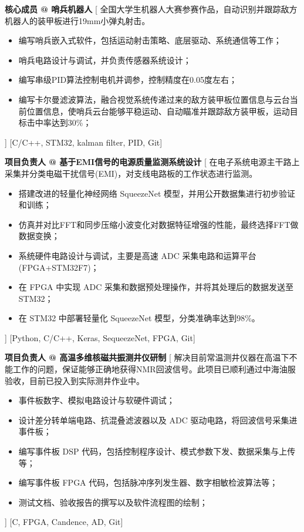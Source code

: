\begin{experiences}
    {\textbf{核心成员 @ 哨兵机器人}}%
    [
    全国大学生机器人大赛参赛作品，自动识别并跟踪敌方机器人的装甲板进行19mm小弹丸射击。
        \begin{itemize}
            \item {编写哨兵嵌入式软件，包括运动射击策略、底层驱动、系统通信等工作；}
            \item {哨兵电路设计与调试，并负责传感器系统设计；}
            \item {编写串级PID算法控制电机并调参，控制精度在0.05度左右；}
            \item {编写卡尔曼滤波算法，融合视觉系统传递过来的敌方装甲板位置信息与云台当前位置信息，使哨兵云台能够平稳运动、自动瞄准并跟踪敌方装甲板，运动目标击中率达到30\%；}
        \end{itemize}
    ]
    [C/C++, STM32, kalman filter, PID, Git]
    \separator{0.5ex}

    {\textbf{项目负责人 @ 基于EMI信号的电源质量监测系统设计 }}%
    [
    在电子系统电源主干路上采集并分类电磁干扰信号(EMI)，对支线电路板的工作状态进行监测。
        \begin{itemize}
            \item {搭建改进的轻量化神经网络 SqueezeNet 模型，并用公开数据集进行初步验证和训练；}
            \item {仿真并对比FFT和同步压缩小波变化对数据特征增强的性能，最终选择FFT做数据变换；}
            \item {系统硬件电路设计与调试，主要是高速 ADC 采集电路和运算平台(FPGA+STM32F7)；}
            \item {在 FPGA 中实现 ADC 采集和数据预处理操作，并将其处理后的数据发送至STM32；}
            \item {在 STM32 中部署轻量化 SqueezeNet 模型，分类准确率达到98\%。}
        \end{itemize}]
    [Python, C/C++, Keras, SequeezeNet, FPGA, Git]
    
    {\textbf{项目负责人 @ 高温多维核磁共振测井仪研制 }}%
    [
    解决目前常温测井仪器在高温下不能工作的问题，保证能够正确地获得NMR回波信号。此项目已顺利通过中海油服验收，目前已投入到实际测井作业中。
    \begin{itemize}
    	\item {事件板数字、模拟电路设计与软硬件调试；}
    	\item {设计差分转单端电路、抗混叠滤波器以及 ADC 驱动电路，将回波信号采集进事件板；}
    	\item {编写事件板 DSP 代码，包括控制程序设计、模式参数下发、数据采集与上传等；}
    	\item {编写事件板 FPGA 代码，包括脉冲序列发生器、数字相敏检波算法等；}
    	\item {测试文档、验收报告的撰写以及软件流程图的绘制；}
    \end{itemize}]
    [C, FPGA, Candence, AD, Git]
    

\end{experiences}
